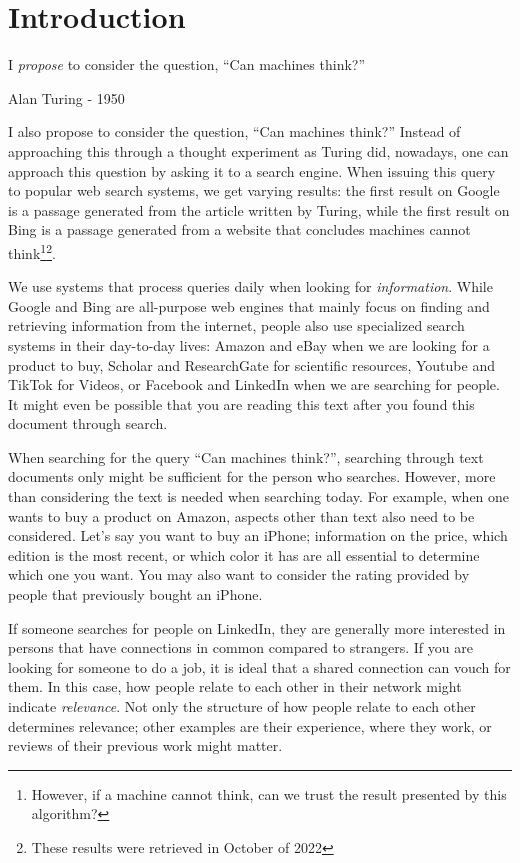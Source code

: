 \chapter{Introduction}
\label{chp:introduction}
\epigraph{I \textit{propose} to consider the question, ``Can machines think?''}{Alan Turing - 1950}

I also propose to consider the question, ``Can machines think?'' Instead of approaching this through a thought experiment as Turing did, nowadays, one can approach this question by asking it to a search engine. When issuing this query to popular web search systems, we get varying results: the first result on Google is a passage generated from the article written by Turing, while the first result on Bing is a passage generated from a website that concludes machines cannot think\footnote{However, if a machine cannot think, can we trust the result presented by this algorithm?}\footnote{These results were retrieved in October of 2022}.

We use systems that process queries daily when looking for \textit{information}. While Google and Bing are all-purpose web engines that mainly focus on finding and retrieving information from the internet, people also use specialized search systems in their day-to-day lives: Amazon and eBay when we are looking for a product to buy, Scholar and ResearchGate for scientific resources, Youtube and TikTok for Videos, or Facebook and LinkedIn when we are searching for people. It might even be possible that you are reading this text after you found this document through search. 

When searching for the query ``Can machines think?'', searching through text documents only might be sufficient for the person who searches. However, more than considering the text is needed when searching today. For example, when one wants to buy a product on Amazon, aspects other than text also need to be considered. Let's say you want to buy an iPhone; information on the price, which edition is the most recent, or which color it has are all essential to determine which one you want. You may also want to consider the rating provided by people that previously bought an iPhone.

If someone searches for people on LinkedIn, they are generally more interested in persons that have connections in common compared to strangers. If you are looking for someone to do a job, it is ideal that a shared connection can vouch for them. In this case, how people relate to each other in their network might indicate \textit{relevance}. Not only the structure of how people relate to each other determines relevance; other examples are their experience, where they work, or reviews of their previous work might matter.

